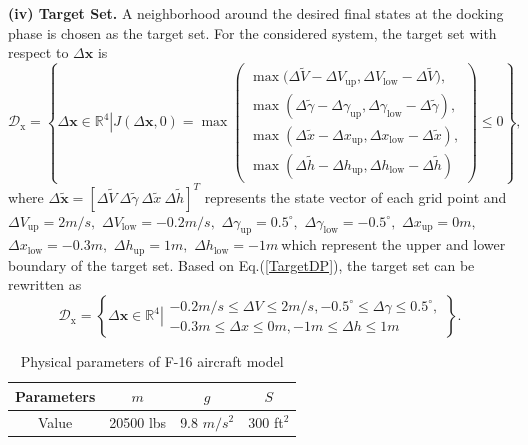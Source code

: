 \textbf{(iv) Target Set.} A neighborhood around the desired final states at
the docking phase is chosen as the target set. For the considered system,
the target set with respect to $\Delta \mathbf{x}$ is%
\begin{equation}
\mathcal{D}_\text{x}=\left\{ \left.\Delta\mathbf{x\in}%
\mathbb{R}%
^{4}\right\vert {J}(\Delta\mathbf{x,}0)=\max\left(\begin{array}{l}
\max\mathbf{(}\Delta\tilde{V}-\Delta V_\text{up},\Delta V_\text{low}-\Delta\tilde{V}),\\
\max(\Delta\tilde{\gamma}-\Delta\gamma_\text{up},\Delta\gamma_\text{low}-\Delta\tilde{\gamma}),\\
\max(\Delta\tilde{x}-\Delta x_\text{up},\Delta x_\text{low}-\Delta\tilde{x}),\\
\max(\Delta\tilde{h}-\Delta h_\text{up},\Delta h_\text{low}-\Delta\tilde{h})
\end{array}\right)\leq0\right\} ,\label{TargetDP}
\end{equation}
where $\Delta \mathbf{\tilde{x}}=[\Delta \tilde{V}\ \Delta \tilde{\gamma}\
\Delta \tilde{x}\ \Delta \tilde{h}]^{T}$ represents the state vector of each
grid point and $\Delta V_\text{up}=2{m}/{s,}$ $\Delta V_\text{low}=-0.2{m}/{s,}$ $%
\Delta \gamma_\text{up}={{0.5}^{\circ},}$ $\Delta \gamma_\text{low}=-{{0.5}^{\circ},}$
$\Delta x_\text{up}=0m,$ $\Delta x_\text{low}=-0.3m,$ $\Delta h_\text{up}=1m,$ $\Delta
h_\text{low}=-1m\ $which represent the upper and lower boundary of the target
set. Based on Eq.(\ref{TargetDP}), the target set can be rewritten as
\begin{equation}
\mathcal{D}_\text{x}=\left \{ \left. \Delta \mathbf{x\in}%
\mathbb{R}
^{4}\right \vert
\begin{array}{c}
-0.2{m}/{s}\leq \Delta V\leq2{m}/{s},-{{0.5}^{\circ}}\leq \Delta \gamma \leq
{{0.5}^{\circ}}, \\
-0.3m\leq \Delta x\leq0m,-1m\leq \Delta h\leq1m%
\end{array}
\right \} .  \label{14}
\end{equation}
\begin{table}[ptb]
	\caption{Physical parameters of F-16 aircraft model}
	\label{Physical_parameters}%
	\centering%
	\begin{tabular}{c|c|c|c}
		\hline\hline
		Parameters & $m$ & $g$ & $S$ \\ \hline
		Value & 20500 lbs & 9.8 $m/s^{2}$ & 300 ft$^{2}$ \\ \hline\hline
	\end{tabular}%
\end{table}
